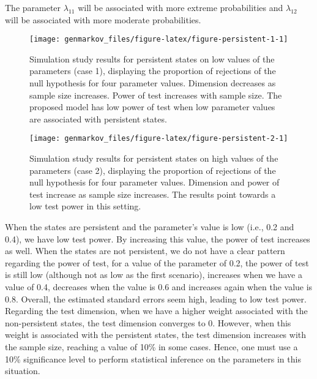 The parameter \(\lambda_{11}\) will be associated with more extreme probabilities and \(\lambda_{12}\) will be associated with more moderate probabilities.

\begin{figure}

{\centering \texttt{[image: genmarkov\_files/figure-latex/figure-persistent-1-1]} 

}

\caption{Simulation study results for persistent states on low values of the parameters (case 1), displaying the proportion of rejections of the null hypothesis for four parameter values. Dimension decreases as sample size increases. Power of test increases with sample size. The proposed model has low power of test when low parameter values are associated with persistent states.}\label{fig:figure-persistent-1}
\end{figure}

\begin{figure}

{\centering \texttt{[image: genmarkov\_files/figure-latex/figure-persistent-2-1]} 

}

\caption{Simulation study results for persistent states on high values of the parameters (case 2), displaying the proportion of rejections of the null hypothesis for four parameter values. Dimension and power of test increase as sample size increases. The results point towards a low test power in this setting.}\label{fig:figure-persistent-2}
\end{figure}

When the states are persistent and the parameter's value is low (i.e., 0.2 and 0.4), we have low test power. By increasing this value, the power of test increases as well. When the states are not persistent, we do not have a clear pattern regarding the power of test, for a value of the parameter of 0.2, the power of test is still low (although not as low as the first scenario), increases when we have a value of 0.4, decreases when the value is 0.6 and increases again when the value is 0.8. Overall, the estimated standard errors seem high, leading to low test power. Regarding the test dimension, when we have a higher weight associated with the non-persistent states, the test dimension converges to 0. However, when this weight is associated with the persistent states, the test dimension increases with the sample size, reaching a value of 10\% in some cases. Hence, one must use a 10\% significance level to perform statistical inference on the parameters in this situation.

